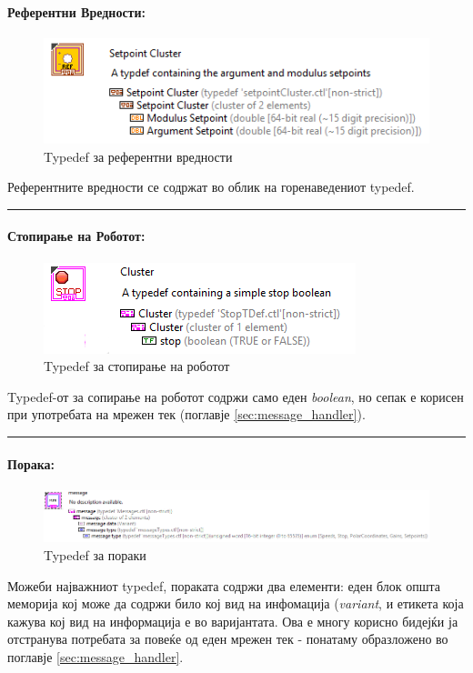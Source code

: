 \documentclass[12pt]{article}
\begin{document}
      \paragraph{Референтни Вредности:\\}
	      \begin{figure}[H]
	        \includegraphics[width=0.55\linewidth]{./images/typedef_setpoints_border.png}
		      \caption{Typedef за референтни вредности}
	        \label{fig:setpoints_typedef}
	        \raggedright
	        \end{figure}
	      Референтните вредности се содржат во облик на горенаведениот typedef.\\
        \textcolor[RGB]{150,150,150}{\rule{\linewidth}{1.6pt}}

      \paragraph{Стопирање на Роботот:\\}
	      \begin{figure}[H]
	        \includegraphics[width=0.55\linewidth]{./images/typedef_stop_border.png}
		      \caption{Typedef за стопирање на роботот}
	        \label{fig:setpoints_typedef}
	        \raggedright
	        \end{figure}
        Typedef-от за сопирање на роботот содржи само еден \textit{boolean}, но сепак е корисен при употребата на мрежен тек (поглавје \ref{sec:message_handler}).\\
        \textcolor[RGB]{150,150,150}{\rule{\linewidth}{1.6pt}}

      \paragraph{Порака:\\}
        \begin{figure}[H]
          \includegraphics[width=0.85\linewidth]{./images/typedef_message.png}
          \caption{Typedef за пораки}
          \label{fig:message_typedef}
          \raggedright
          \end{figure}
        Можеби најважниот typedef, пораката содржи два елементи: еден блок општа меморија кој може да содржи било кој вид на инфомација (\textit{variant}, и етикета која кажува кој вид на информација е во варијантата. Ова е многу корисно бидејќи ја отстранува потребата за повеќе од еден мрежен тек - понатаму образложено во поглавје \ref{sec:message_handler}.
\end{document}
